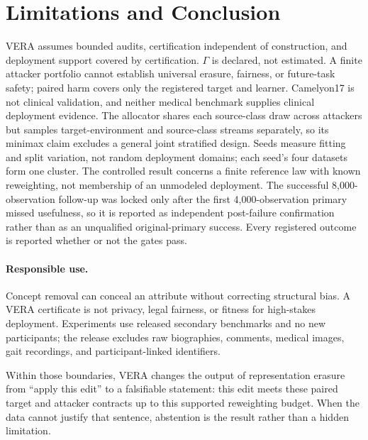 \section{Limitations and Conclusion}

VERA assumes bounded audits, certification independent of construction, and
deployment support covered by certification. $\Gamma$ is declared, not
estimated. A finite attacker portfolio cannot establish universal erasure,
fairness, or future-task safety; paired harm covers only the registered target
and learner. Camelyon17 is not clinical validation, and neither medical
benchmark supplies clinical deployment evidence. The allocator shares each
source-class draw across attackers but samples target-environment and
source-class streams separately, so its minimax claim excludes a general joint
stratified design. Seeds measure fitting and split variation, not random
deployment domains; each seed's four datasets form one cluster. The controlled
result concerns a finite reference law with known reweighting, not membership
of an unmodeled deployment. The successful 8,000-observation follow-up was
locked only after the first 4,000-observation primary missed usefulness, so it
is reported as independent post-failure confirmation rather than as an
unqualified original-primary success. Every registered outcome is reported
whether or not the gates pass.

\paragraph{Responsible use.}
Concept removal can conceal an attribute without correcting structural bias.
A VERA certificate is not privacy, legal fairness, or fitness for high-stakes
deployment. Experiments use released secondary benchmarks and no new
participants; the release excludes raw biographies, comments, medical images,
gait recordings, and participant-linked identifiers.

Within those boundaries, VERA changes the output of representation erasure
from ``apply this edit'' to a falsifiable statement: this edit meets these
paired target and attacker contracts up to this supported reweighting budget.
When the data cannot justify that sentence, abstention is the result rather
than a hidden limitation.
